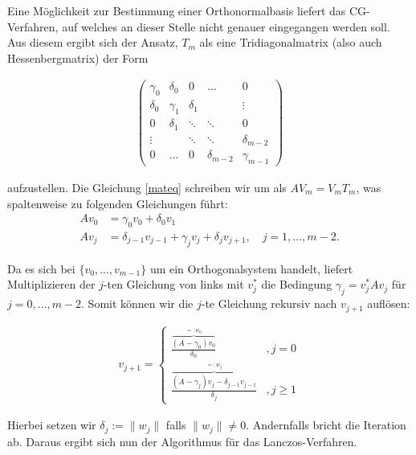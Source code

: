 \documentclass{article}
\theoremstyle{plain}
\begin{document}
Eine Möglichkeit zur Bestimmung einer Orthonormalbasis liefert das CG-Verfahren, auf welches an dieser Stelle nicht genauer eingegangen werden soll. Aus diesem ergibt sich der Ansatz, $T_m$ als eine Tridiagonalmatrix (also auch Hessenbergmatrix) der Form

\begin{align}\label{trimatrix}
\begin{pmatrix}
	\gamma_0 & \delta_0 & 0 & \hdots & 0 \\
	\delta_0 & \gamma_1 & \delta_1 &  & \vdots \\
	0 & \delta_1 & \ddots & \ddots & 0 \\
	\vdots &  & \ddots & \ddots & \delta_{m-2} \\
	0 & \hdots & 0 & \delta_{m-2} & \gamma_{m-1}
\end{pmatrix}
\end{align}

aufzustellen. Die Gleichung \ref{mateq} schreiben wir um als $AV_m = V_m T_m$, was spaltenweise zu folgenden Gleichungen führt:
\begin{align*}
	A v_0 &= \gamma_0 v_0 + \delta_0 v_1 \\
	A v_j &= \delta_{j-1} v_{j-1} + \gamma_j v_j + \delta_j v_{j+1}, \quad j=1, \dots, m-2.
\end{align*}

Da es sich bei $\{v_0, \dots, v_{m-1}\}$ um ein Orthogonalsystem handelt, liefert Multiplizieren der $j$-ten Gleichung von links mit $v_j^*$ die Bedingung $\gamma_j = v_j^*Av_j$ für $j = 0, \dots, m-2$. Somit können wir die $j$-te Gleichung rekursiv nach $v_{j+1}$ auflösen:

\begin{align*}
	v_{j+1} = \begin{cases}
		\frac{\overbrace{(A-\gamma_0)v_0}^{=:w_0}}{\delta_0} &,j = 0 \\
		\frac{\overbrace{(A-\gamma_j)v_j - \delta_{j-1} v_{j-1}}^{=:w_j}}{\delta_j} &,j \geq 1
	\end{cases}
\end{align*}

Hierbei setzen wir $\delta_j := \|w_j\|$ falls $\|w_j\| \neq 0$. Andernfalls bricht die Iteration ab. Daraus ergibt sich nun der Algorithmus für das Lanczos-Verfahren.

\renewcommand{\algorithmicrequire}{\textbf{Input:}}
\renewcommand{\algorithmicensure}{\textbf{Output:}}
\end{document}
